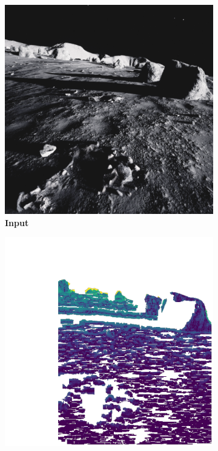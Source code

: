 \begin{figure}[b!]
	\centering
	\begin{subfigure}[b]{0.16\textwidth}
		\includegraphics[width=\textwidth]{figures/rgb.png}
		\caption{\bfseries Input}
	\end{subfigure}\hfill
	\begin{subfigure}[b]{0.16\textwidth}
		\includegraphics[width=\textwidth]{figures/depth_error_BM.png}

\end{subfigure}
\end{figure}
